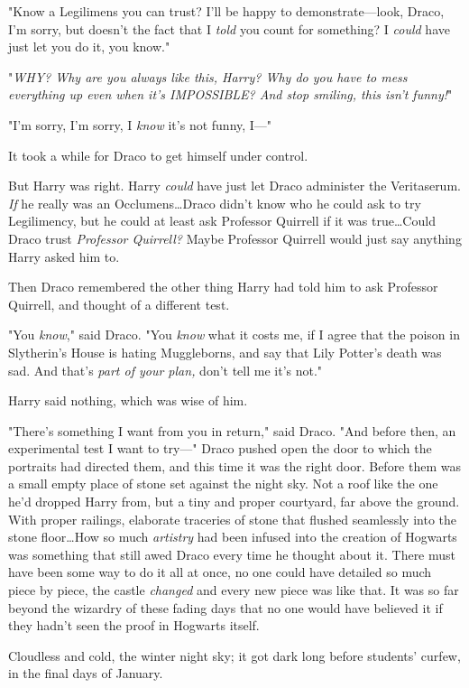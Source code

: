"Know a Legilimens you can trust? I’ll be happy to demonstrate—look, Draco,
I’m sorry, but doesn’t the fact that I \emph{told} you count for something? I
\emph{could} have just let you do it, you know."

"\emph{WHY? Why are you always like this, Harry? Why do you have to mess
everything up even when it’s IMPOSSIBLE? And stop smiling, this isn’t funny!}"

"I’m sorry, I’m sorry, I \emph{know} it’s not funny, I—"

It took a while for Draco to get himself under control.

But Harry was right. Harry \emph{could} have just let Draco administer the
Veritaserum. \emph{If} he really was an Occlumens…Draco didn’t know who
he could ask to try Legilimency, but he could at least ask Professor Quirrell
if it was true…Could Draco trust \emph{Professor Quirrell?} Maybe
Professor Quirrell would just say anything Harry asked him to.

Then Draco remembered the other thing Harry had told him to ask Professor
Quirrell, and thought of a different test.

"You \emph{know}," said Draco. "You \emph{know} what it costs me, if I agree
that the poison in Slytherin’s House is hating Muggleborns, and say that Lily
Potter’s death was sad. And that’s \emph{part of your plan,} don’t tell me it’s
not."

Harry said nothing, which was wise of him.

"There’s something I want from you in return," said Draco. "And before then, an
experimental test I want to try—"
\later
Draco pushed open the door to which the portraits had directed them, and this
time it was the right door. Before them was a small empty place of stone set
against the night sky. Not a roof like the one he’d dropped Harry from, but a
tiny and proper courtyard, far above the ground. With proper railings,
elaborate traceries of stone that flushed seamlessly into the stone
floor…How so much \emph{artistry} had been infused into the creation of
Hogwarts was something that still awed Draco every time he thought about it.
There must have been some way to do it all at once, no one could have detailed
so much piece by piece, the castle \emph{changed} and every new piece was like
that. It was so far beyond the wizardry of these fading days that no one would
have believed it if they hadn’t seen the proof in Hogwarts itself.

Cloudless and cold, the winter night sky; it got dark long before students’
curfew, in the final days of January.

